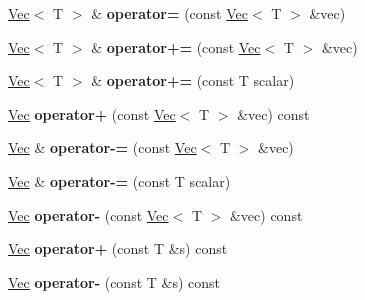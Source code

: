 \begin{DoxyCompactItemize}
\item 
\hypertarget{class_vec_ac05f4da4bc8dc71cdec5f00137614428}{\hyperlink{class_vec}{Vec}$<$ T $>$ \& {\bfseries operator=} (const \hyperlink{class_vec}{Vec}$<$ T $>$ \&vec)}\label{class_vec_ac05f4da4bc8dc71cdec5f00137614428}

\item 
\hypertarget{class_vec_aba78881fc0ac4e16d7b1a083812e7bb0}{\hyperlink{class_vec}{Vec}$<$ T $>$ \& {\bfseries operator+=} (const \hyperlink{class_vec}{Vec}$<$ T $>$ \&vec)}\label{class_vec_aba78881fc0ac4e16d7b1a083812e7bb0}

\item 
\hypertarget{class_vec_a967ee3dd4c21f1d69c13d39166c5f552}{\hyperlink{class_vec}{Vec}$<$ T $>$ \& {\bfseries operator+=} (const T scalar)}\label{class_vec_a967ee3dd4c21f1d69c13d39166c5f552}

\item 
\hypertarget{class_vec_a609f630064a0bb836fd2ce617f6b55fa}{\hyperlink{class_vec}{Vec} {\bfseries operator+} (const \hyperlink{class_vec}{Vec}$<$ T $>$ \&vec) const }\label{class_vec_a609f630064a0bb836fd2ce617f6b55fa}

\item 
\hypertarget{class_vec_aa1e8fd4f36b05d7428895a62fc08599b}{\hyperlink{class_vec}{Vec} \& {\bfseries operator-\/=} (const \hyperlink{class_vec}{Vec}$<$ T $>$ \&vec)}\label{class_vec_aa1e8fd4f36b05d7428895a62fc08599b}

\item 
\hypertarget{class_vec_abfa9b3a8e4c4f1ce382a06de44d3965d}{\hyperlink{class_vec}{Vec} \& {\bfseries operator-\/=} (const T scalar)}\label{class_vec_abfa9b3a8e4c4f1ce382a06de44d3965d}

\item 
\hypertarget{class_vec_a7b5cbb970e65ad2c20b94b4f16eb5223}{\hyperlink{class_vec}{Vec} {\bfseries operator-\/} (const \hyperlink{class_vec}{Vec}$<$ T $>$ \&vec) const }\label{class_vec_a7b5cbb970e65ad2c20b94b4f16eb5223}

\item 
\hypertarget{class_vec_ade2621eb83e79a04d50fd488df6efa70}{\hyperlink{class_vec}{Vec} {\bfseries operator+} (const T \&s) const }\label{class_vec_ade2621eb83e79a04d50fd488df6efa70}

\item 
\hypertarget{class_vec_a32779ffb7d9adf07b4a377b3be7bf458}{\hyperlink{class_vec}{Vec} {\bfseries operator-\/} (const T \&s) const }\label{class_vec_a32779ffb7d9adf07b4a377b3be7bf458}


\end{DoxyCompactItemize}
